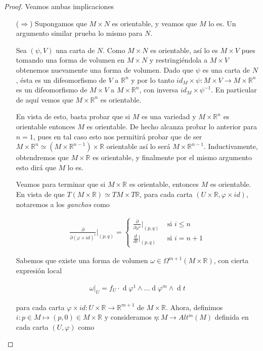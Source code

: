 \documentclass[11pt]{article}
\newcommand{\R}{\mathbb{R}}
\renewcommand{\d}{\operatorname{d}}
\begin{document}
\begin{proof} Veamos ambas implicaciones
\begin{itemize}[listparindent = \parindent]
\item[($\Rightarrow$)] Supongamos que $M \times N$ es orientable, y veamos que $M$ lo es. Un argumento similar prueba lo mismo para $N$.

Sea $(\psi, V)$ una carta de $N$. Como $M \times N$ es orientable, así lo es $M \times V$ pues tomando una forma de volumen en $M \times N$ y restringiéndola a $M \times V$ obtenemos nuevamente una forma de volumen. Dado que $\psi$ es una carta de $N$, ésta es un difeomorfismo de $V$ a $\R^n$ y por lo tanto $id_M \times \psi : M \times V \to M \times \R^n$ es un difeomorfismo de $M \times V$ a $M \times \R^n$, con inversa $id_M \times \psi^{-1}$. En particular de aquí vemos que $M \times \R^n$ es orientable.

En vista de esto, basta probar que si $M$ es una variedad y $M \times \R^n$ es orientable entonces $M$ es orientable. De hecho alcanza probar lo anterior para $n = 1$, pues en tal caso esto nos permitirá probar que de ser $M \times \R^n \simeq (M \times \R^{n-1}) \times \R$ orientable así lo será $M \times \R^{n-1}$. Inductivamente, obtendremos que $M \times \R$ es orientable, y finalmente por el mismo argumento esto dirá que $M$ lo es.

Veamos para terminar que si $M \times \R$ es orientable, entonces $M$ es orientable. En vista de que $T(M \times \R) \simeq TM \times T\R$, para cada carta $(U \times \R, \varphi \times id)$, notaremos a los \textit{ganchos} como

\begin{align*}
\frac{\partial}{\partial (\varphi \times id)^i}\Bigg|_{(p,q)} = \begin{cases}
\frac{\partial}{\partial \varphi^i}|_{(p,q)} &\text{ si $i \leq n$}\\
\frac{d}{dt}|_{(p,q)} &\text{ si $i = n+1$}
\end{cases}
\end{align*}

Sabemos que existe una forma de volumen $\omega  \in \Omega^{m+1}(M \times \R)$, con cierta expresión local

\begin{align*}
\omega|_U = f_U \cdot \d\varphi^1 \wedge \dots \d\varphi^m \wedge \d t
\end{align*}

para cada carta $\varphi \times id : U \times \R \to \R^{m+1}$ de $M \times \R$. Ahora, definimos $i : p \in M \mapsto (p,0) \in M \times \R$ y consideramos $\eta : M \to Alt^m(M)$ definida en cada carta $(U, \varphi)$ como


\end{itemize}
\end{proof}
\end{document}
